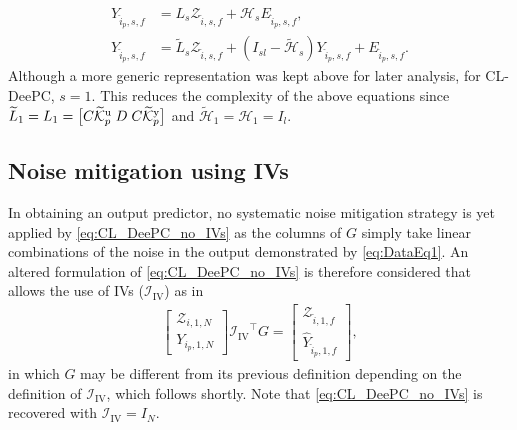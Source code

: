 \begin{align}
    Y_{\hat{i}_p,s,f} &= L_s \mathcal{Z}_{\hat{i},s,f} + \mathcal{H}_s E_{\hat{i}_p,s,f},\label{eq:DataEq1.2}\\
    Y_{\hat{i}_p,s,f} &= \widetilde{L}_s \mathcal{Z}_{\hat{i},s,f} + (I_{sl}-\widetilde{\mathcal{H}}_s) Y_{\hat{i}_p,s,f} + E_{\hat{i}_p,s,f}\label{eq:DataEq2.2}.
\end{align}
Although a more generic representation was kept above for later analysis, for \ac{CL-DeePC}, $s=1$. This reduces the complexity of the above equations since ${\widetilde{L}_1=L_1=\big[ C\widetilde{\mathcal{K}}_{p}^{\mathrm{{u}}} \; D \; C\widetilde{\mathcal{K}}_{p}^{\mathrm{{y}}} \big]}$ and $\widetilde{\mathcal{H}}_1=\mathcal{H}_1=I_l$.
%
\subsection{Noise mitigation using \acl{IVs}}
In obtaining an output predictor, no systematic noise mitigation strategy is yet applied by \eqref{eq:CL_DeePC_no_IVs} as the columns of $G$ simply take linear combinations of the noise in the output demonstrated by \eqref{eq:DataEq1}. An altered formulation of \eqref{eq:CL_DeePC_no_IVs} is therefore considered that allows the use of \ac{IVs} ($\mathcal{I}_\mathrm{IV}$) as in~\cite{vanWingerden2022}
\begin{align}\label{eq:CL_DeePC_IV}
    \begin{bmatrix}
   \mathcal{Z}_{i,1,N}\\
   \hline
   Y_{i_p,1,N}
    \end{bmatrix}
{\mathcal{I}_\mathrm{IV}}^\top G =
\begin{bmatrix}
    \mathcal{Z}_{\hat{i},1,f}\\
    \hline
    \widehat{Y}_{\hat{i}_p,1,f}
\end{bmatrix},
\end{align}
in which $G$ may be different from its previous definition depending on the definition of $\mathcal{I}_\mathrm{IV}$, which follows shortly. Note that \eqref{eq:CL_DeePC_no_IVs} is recovered with $\mathcal{I}_\mathrm{IV}=I_N$.

